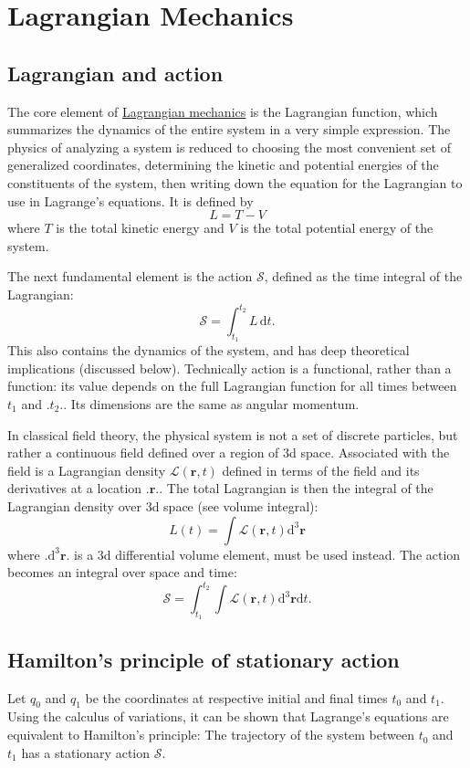 \documentclass{article}
\begin{document}

\section{Lagrangian Mechanics}
\subsection{Lagrangian and action}
The core element of \href{https://en.wikipedia.org/wiki/Lagrangian_mechanics}{Lagrangian mechanics} is the Lagrangian function, which summarizes the dynamics of the entire system in a very simple expression. The physics of analyzing a system is reduced to choosing the most convenient set of generalized coordinates, determining the kinetic and potential energies of the constituents of the system, then writing down the equation for the Lagrangian to use in Lagrange's equations. It is defined by
$$ L = T -V $$
where $T$ is the total kinetic energy and $V$ is the total potential energy of the system.

The next fundamental element is the action $\mathcal{S}$, defined as the time integral of the Lagrangian:
$$\mathcal{S} = \int_{t_1}^{t_2} L\,\mathrm{d}t.$$
This also contains the dynamics of the system, and has deep theoretical implications (discussed below). Technically action is a functional, rather than a function: its value depends on the full Lagrangian function for all times between $t_1$ and $\bigl. t_2\bigr.$. Its dimensions are the same as angular momentum.

In classical field theory, the physical system is not a set of discrete particles, but rather a continuous field defined over a region of 3d space. Associated with the field is a Lagrangian density $\mathcal{L}(\mathbf{r},t)$ defined in terms of the field and its derivatives at a location $\bigl.\mathbf{r}\bigr.$. The total Lagrangian is then the integral of the Lagrangian density over 3d space (see volume integral):
 $$L(t) = \int  \mathcal{L}(\mathbf{r},t) \mathrm{d}^3 \mathbf{r}$$
 where $\bigl.\mathrm{d}^3\mathbf{r}\bigr.$ is a 3d differential volume element, must be used instead. The action becomes an integral over space and time:
 $$\mathcal{S} = \int_{t_1}^{t_2}\int \mathcal{L}(\mathbf{r},t) \mathrm{d}^3\mathbf{r} \mathrm{d}t.$$

 \subsection{Hamilton's principle of stationary action}
 Let $q_0$ and $q_1$ be the coordinates at respective initial and final times $t_0$ and $t_1$. Using the calculus of variations, it can be shown that Lagrange's equations are equivalent to Hamilton's principle: The trajectory of the system between $t_0$ and $t_1$ has a stationary action $\mathcal{S}$.
\end{document}
